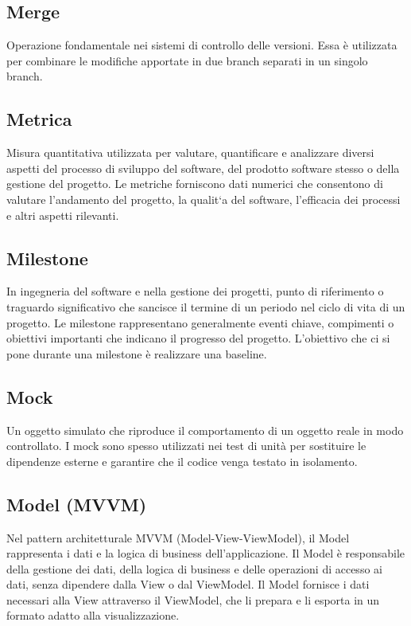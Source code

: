 \hypertarget{sec:merge}{}
\subsection*{Merge}
Operazione fondamentale nei sistemi di controllo delle versioni. Essa è utilizzata per combinare le modifiche apportate in due branch separati in un 
singolo branch.

\hypertarget{sec:metrica}{}
\subsection*{Metrica}
Misura quantitativa utilizzata per valutare, quantificare e analizzare diversi aspetti del processo di sviluppo del software, del prodotto software stesso o della gestione del
progetto. Le metriche forniscono dati numerici che consentono di valutare l’andamento del
progetto, la qualit`a del software, l’efficacia dei processi e altri aspetti rilevanti.

\subsection*{Milestone}
In ingegneria del software e nella gestione dei progetti, punto di riferimento o traguardo significativo che sancisce il termine di un periodo nel ciclo 
di vita di un progetto. Le milestone rappresentano generalmente eventi chiave, compimenti o obiettivi importanti che indicano il progresso del progetto. 
L’obiettivo che ci si pone durante una milestone è realizzare una baseline.

\hypertarget{sec:mock}{}
\subsection*{Mock}
Un oggetto simulato che riproduce il comportamento di un oggetto reale in modo controllato. I mock sono spesso utilizzati nei test di unità per sostituire
le dipendenze esterne e garantire che il codice venga testato in isolamento.

\hypertarget{sec:model_mvvm}{}
\subsection*{Model (MVVM)}
Nel pattern architetturale MVVM (Model-View-ViewModel), il Model rappresenta i dati e la logica di business dell'applicazione. Il Model è responsabile della
gestione dei dati, della logica di business e delle operazioni di accesso ai dati, senza dipendere dalla View o dal ViewModel. Il Model fornisce i dati
necessari alla View attraverso il ViewModel, che li prepara e li esporta in un formato adatto alla visualizzazione.

